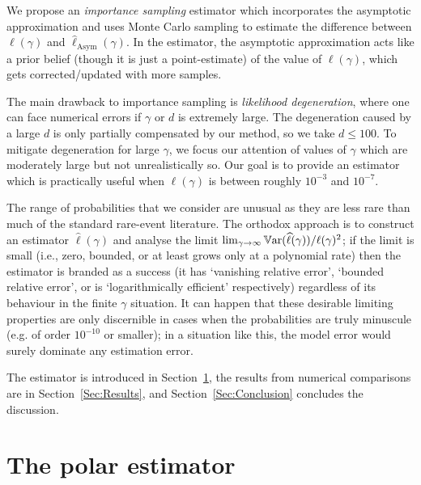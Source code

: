 We propose an \emph{importance sampling} estimator which incorporates the asymptotic approximation and uses Monte Carlo sampling to estimate the difference between $\ell(\gamma)$ and $\hat{\ell}_{\mathrm{Asym}}(\gamma)$. In the estimator, the asymptotic approximation acts like a prior belief (though it is just a point-estimate) of the value of $\ell(\gamma)$, which gets corrected/updated with more samples.

The main drawback to importance sampling is \emph{likelihood degeneration}, where one can face numerical errors if $\gamma$ or $d$ is extremely large.
The degeneration caused by a large $d$ is only partially compensated by our method, so we take $d \le 100$.
To mitigate degeneration for large $\gamma$, we focus our attention of values of $\gamma$ which are moderately large but not unrealistically so.
Our goal is to provide an estimator which is practically useful when $\ell(\gamma)$ is between roughly $10^{-3}$ and $10^{-7}$.%

The range of probabilities that we consider are unusual as they are less rare than much of the standard rare-event literature. The orthodox approach is to construct an estimator $\hat{\ell}(\gamma)$ and analyse the limit $\lim_{\gamma\to\infty} \operatorname{\mathbb{V}\mathrm{ar}}(\widehat{\ell}(\gamma))/\ell(\gamma)^2$; if the limit is small (i.e., zero, bounded, or at least grows only at a polynomial rate) then the estimator is branded as a success (it has `vanishing relative error', `bounded relative error', or is `logarithmically efficient' respectively) regardless of its behaviour in the finite $\gamma$ situation. It can happen that these desirable limiting properties are only discernible in cases when the probabilities are truly minuscule (e.g. of order $10^{-10}$ or smaller); in a situation like this, the model error would surely dominate any estimation error.

The estimator is introduced in Section~\ref{scn:Estimator}, the results from numerical comparisons are in Section~\ref{Sec:Results}, and Section~\ref{Sec:Conclusion} concludes the discussion.

\section{The polar estimator} \label{scn:Estimator}

